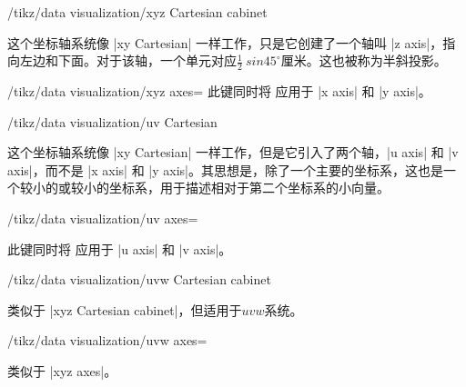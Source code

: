 \begin{key}{/tikz/data visualization/xyz Cartesian cabinet}

    这个坐标轴系统像 |xy Cartesian| 一样工作，只是它创建了一个轴叫 |z axis|，指向左边和下面。对于该轴，一个单元对应$\frac{1}{2}\ sin45 ^\circ$厘米。这也被称为半斜投影。

    \begin{key}{/tikz/data visualization/xyz axes=} %
      此键同时将  应用于 |x axis| 和 |y axis|。
    \end{key}
\end{key}

\begin{key}{/tikz/data visualization/uv Cartesian}

    这个坐标轴系统像 |xy Cartesian| 一样工作，但是它引入了两个轴，|u axis| 和 |v axis|，而不是 |x axis| 和 |y axis|。其思想是，除了一个主要的坐标系，这也是一个较小的或较小的坐标系，用于描述相对于第二个坐标系的小向量。

    \begin{key}{/tikz/data visualization/uv axes=} %

        此键同时将  应用于 |u axis| 和 |v axis|。
    \end{key}
\end{key}

\begin{key}{/tikz/data visualization/uvw Cartesian cabinet}

    类似于 |xyz Cartesian cabinet|，但适用于$uvw$系统。

    \begin{key}{/tikz/data visualization/uvw axes=} %

      类似于 |xyz axes|。
    \end{key}
\end{key}


